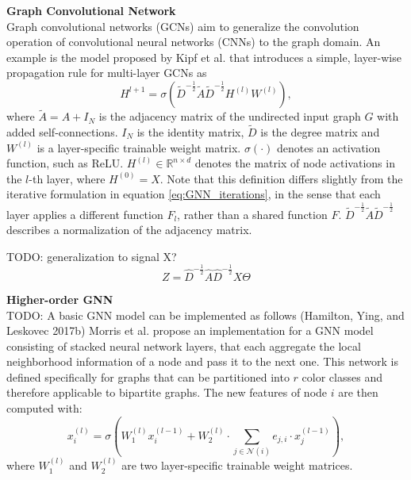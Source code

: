 \textbf{Graph Convolutional Network} \\
Graph convolutional networks (GCNs) aim to generalize the convolution operation of convolutional neural networks (CNNs) to the graph domain. An example is the model proposed by Kipf et al.\cite{kipf2016semi} that introduces a simple, layer-wise propagation rule for multi-layer GCNs as
\begin{equation}
    H^{l+1} = \sigma(\tilde{D}^{-\frac{1}{2}}\tilde{A}\tilde{D}^{-\frac{1}{2}}H^{(l)}W^{(l)}),
\end{equation}
where $\tilde{A} = A + I_N$ is the adjacency matrix of the undirected input graph $G$ with added self-connections. $I_N$ is the identity matrix, $\tilde{D}$ is the degree matrix and $W^{(l)}$ is a layer-specific trainable weight matrix. $\sigma(\cdot)$ denotes an activation function, such as ReLU. $H^{(l)} \in \mathbb{R}^{n\times d}$ denotes the matrix of node activations in the $l$-th layer, where $H^{(0)} = X$. Note that this definition differs slightly from the iterative formulation in equation \ref{eq:GNN_iterations}, in the sense that each layer applies a different function $F_l$, rather than a shared function $F$. $\tilde{D}^{-\frac{1}{2}}\tilde{A}\tilde{D}^{-\frac{1}{2}}$ describes a normalization of the adjacency matrix.

TODO: generalization to signal X?
\begin{equation}
    Z = \hat{D}^{-\frac{1}{2}}\hat{A}\hat{D}^{-\frac{1}{2}}X\Theta
\end{equation}

\textbf{Higher-order GNN} \\
TODO: A basic GNN model can be implemented as follows (Hamilton, Ying, and Leskovec 2017b)
Morris et al.\cite{morris2019weisfeiler} propose an implementation for a GNN model consisting of stacked neural network layers, that each aggregate the local neighborhood information of a node and pass it to the next one. This network is defined specifically for graphs that can be partitioned into $r$ color classes and therefore applicable to bipartite graphs. The new features of node $i$ are then computed with:
\begin{equation}
    x_i^{(l)} = \sigma(W_1^{(l)}x_i^{(l-1)}+W_2^{(l)}\cdot\sum_{j\in\mathcal{N}(i)}e_{j,i}\cdot x_j^{(l-1)}),
\end{equation}
where $W_1^{(l)}$ and $W_2^{(l)}$ are two layer-specific trainable weight matrices.

